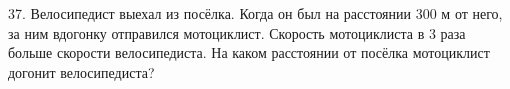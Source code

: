 37. Велосипедист выехал из посёлка. Когда он был на расстоянии 300 м от него, за ним вдогонку отправился мотоциклист. Скорость мотоциклиста в 3 раза больше скорости велосипедиста. На каком расстоянии от посёлка мотоциклист догонит велосипедиста?\\

